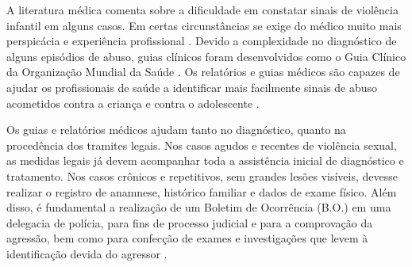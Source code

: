 

A literatura médica comenta sobre a dificuldade em constatar sinais de violência infantil em alguns casos. Em certas circunstâncias se exige do médico muito mais perspicácia e experiência profissional \cite{de2012violencia}. Devido a complexidade no diagnóstico de alguns episódios de abuso, guias clínicos foram desenvolvidos como o Guia Clínico da Organização Mundial da Saúde \cite{world2017responding}. Os relatórios e guias médicos são capazes de ajudar os profissionais de saúde a identificar mais facilmente sinais de abuso acometidos contra a criança e contra o adolescente \cite{Christian1}.



Os guias e relatórios médicos ajudam tanto no diagnóstico, quanto na procedência dos tramites legais. Nos casos agudos e recentes de violência sexual, as medidas legais já devem acompanhar toda a assistência inicial de diagnóstico e tratamento. Nos casos crônicos e repetitivos, sem grandes lesões visíveis, devesse realizar o registro de anamnese, histórico familiar e dados de exame físico. Além disso, é fundamental a realização de um Boletim de Ocorrência (B.O.) em uma delegacia de polícia, para fins de processo judicial e para a comprovação da agressão, bem como para confecção de exames e investigações que levem à identificação devida do agressor \cite{de2012violencia}. 

